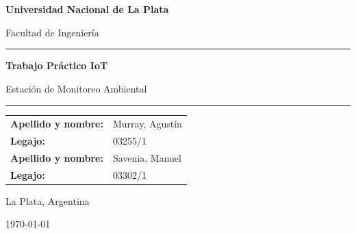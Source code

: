 \documentclass[12pt, a4paper]{article}
\begin{document}
\begin{titlepage}
    \centering
    \vspace*{2cm}

    {\LARGE \textbf{Universidad Nacional de La Plata} \par}
    \vspace{0.4cm}
    {\large Facultad de Ingeniería \par}

    \vspace{2cm}
    \rule{\linewidth}{0.5pt}
    \vspace{0.4cm}

    {\Huge \textbf{Trabajo Práctico IoT} \par}
    \vspace{0.4cm}
    {\Large Estación de Monitoreo Ambiental \par}

    \vspace{0.4cm}
    \rule{\linewidth}{0.5pt}

    \vspace{2.5cm}

    {\large
    \begin{tabular}{ll}
        \textbf{Apellido y nombre:} & Murray, Agustín \\[0.4em]
        \textbf{Legajo:}            & 03255/1 \\[1em]
        \textbf{Apellido y nombre:} & Savenia, Manuel \\[0.4em]
        \textbf{Legajo:}            & 03302/1 \\
    \end{tabular}
    \par}

    \vfill

    {\large La Plata, Argentina \par}
    \vspace{0.3cm}
    {\large \today \par}
\end{titlepage}

\tableofcontents
\newpage

\end{document}
